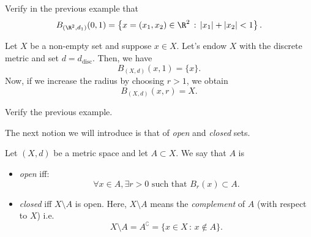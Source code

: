 \begin{ex}
	Verify in the previous example that
	\[
	B_{(\R^2,d_1)}(0,1) = \left\{
	x = (x_1,x_2)\in \R^2 \, : \, |x_1| + |x_2| < 1
	\right\}.
	\]
\end{ex}
\begin{eg}
	Let $X$ be a non-empty set and suppose $x\in X$. Let's endow $X$ with the discrete metric and set $d = d_\text{disc}$. Then, we have
	\[
	B_{(X,d)}(x,1) = \{ x \}.
	\]
	Now, if we increase the radius by choosing $r>1$, we obtain
	\[
	B_{(X,d)}(x,r) = X.
	\]
\end{eg}
\begin{ex}
	Verify the previous example.
\end{ex}
The next notion we will introduce is that of \textit{open} and \textit{closed} sets.
\begin{defn}
	\label{defn:open_closed}
	Let $(X,d)$ be a metric space and let $A\subset X$. We say that $A$ is
	\begin{itemize}
		\item \textit{open} iff:
		\[
		\forall x \in A, \exists r>0\text{ such that }B_r(x) \subset A.
		\]
		\item \textit{closed} iff $X\setminus A$ is open. Here, $X\setminus A$ means the \textit{complement} of $A$ (with respect to $X$) i.e.
		\[
		X\setminus A = A^\complement = \{x \in X \, : \, x \notin A\}.
		\]
	\end{itemize}
\end{defn}
